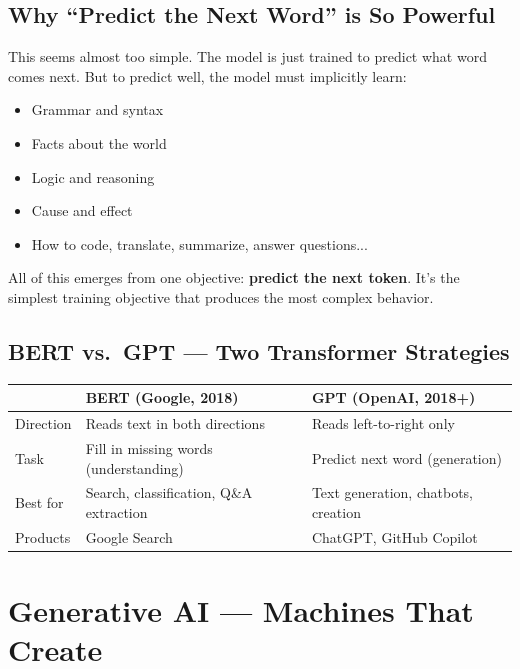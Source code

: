 \documentclass[11pt,a4paper]{report}
\begin{document}
\section{Why ``Predict the Next Word'' is So Powerful}

This seems almost too simple. The model is just trained to predict what word comes next. But to predict well, the model must implicitly learn:

\begin{itemize}
    \item Grammar and syntax
    \item Facts about the world
    \item Logic and reasoning
    \item Cause and effect
    \item How to code, translate, summarize, answer questions...
\end{itemize}

All of this emerges from one objective: \textbf{predict the next token}. It's the simplest training objective that produces the most complex behavior.

\section{BERT vs.\ GPT --- Two Transformer Strategies}

\begin{table}[h]
\centering
\begin{tabularx}{\textwidth}{l X X}
\toprule
& \textbf{BERT (Google, 2018)} & \textbf{GPT (OpenAI, 2018+)} \\
\midrule
Direction & Reads text in both directions & Reads left-to-right only \\
Task & Fill in missing words (understanding) & Predict next word (generation) \\
Best for & Search, classification, Q\&A extraction & Text generation, chatbots, creation \\
Products & Google Search & ChatGPT, GitHub Copilot \\
\bottomrule
\end{tabularx}
\end{table}

\chapter{Generative AI --- Machines That Create}
\end{document}
